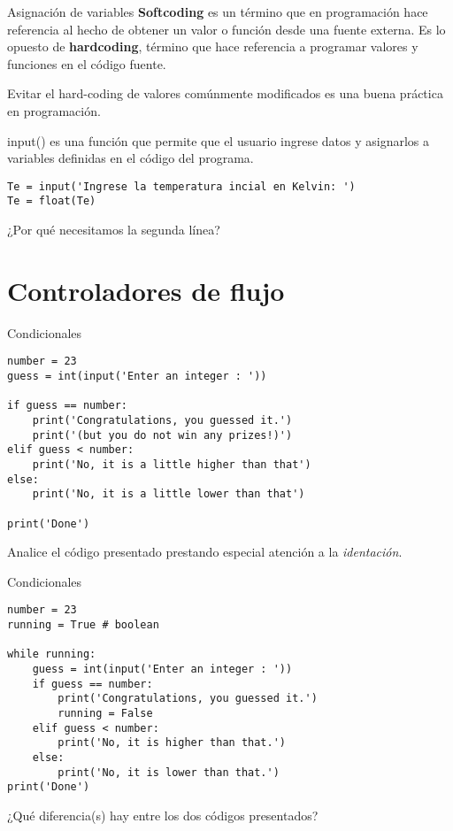 \documentclass[10pt]{beamer}
\begin{document}
\begin{frame}[fragile]{Asignación de variables}
\textbf{Softcoding} es un término que en programación hace referencia al hecho de obtener un valor o función desde una fuente externa. Es lo opuesto de \textbf{hardcoding}, término que hace referencia a programar valores y funciones en el código fuente.

Evitar el hard-coding de valores comúnmente modificados es una buena práctica en programación.

\alert{input()} es una función que permite que el usuario ingrese datos y asignarlos a variables definidas en el código del programa.
	
	\begin{verbatim}
Te = input('Ingrese la temperatura incial en Kelvin: ')
Te = float(Te) 
	\end{verbatim}
	
	\begin{center}
		¿Por qué necesitamos la segunda línea?
	\end{center}
\end{frame}

\section{Controladores de flujo}
\begin{frame}[fragile]{Condicionales}
   \begin{verbatim}
number = 23
guess = int(input('Enter an integer : '))

if guess == number:
	print('Congratulations, you guessed it.')
	print('(but you do not win any prizes!)')
elif guess < number:
	print('No, it is a little higher than that')
else:
	print('No, it is a little lower than that')

print('Done')
   \end{verbatim}
\begin{center}
	Analice el código presentado prestando especial atención a la \emph{identación}.
\end{center}
\end{frame}

\begin{frame}[fragile]{Condicionales}
 \begin{verbatim}
number = 23
running = True # boolean

while running:
	guess = int(input('Enter an integer : '))
	if guess == number:
		print('Congratulations, you guessed it.')
		running = False
	elif guess < number:
		print('No, it is higher than that.')
	else:
		print('No, it is lower than that.')
print('Done')
\end{verbatim}
\begin{center}
	¿Qué diferencia(s) hay entre los dos códigos presentados?
\end{center}  
\end{frame}
\end{document}
